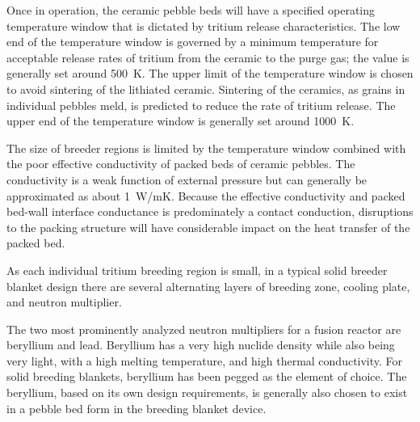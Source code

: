Once in operation, the ceramic pebble beds will have a specified operating temperature window that is dictated by tritium release characteristics. The low end of the temperature window is governed by a minimum temperature for acceptable release rates of tritium from the ceramic to the purge gas; the value is generally set around 500~K. The upper limit of the temperature window is chosen to avoid sintering of the lithiated ceramic. Sintering of the ceramics, as grains in individual pebbles meld, is predicted to reduce the rate of tritium release. The upper end of the temperature window is generally set around 1000~K.

The size of breeder regions is limited by the temperature window combined with the poor effective conductivity of packed beds of ceramic pebbles. The conductivity is a weak function of external pressure but can generally be approximated as about \si{1 W/{mK}}. Because the effective conductivity and packed bed-wall interface conductance is predominately a contact conduction, disruptions to the packing structure will have considerable impact on the heat transfer of the packed bed.

As each individual tritium breeding region is small, in a typical solid breeder blanket design there are several alternating layers of breeding zone, cooling plate, and neutron multiplier. 

The two most prominently analyzed neutron multipliers for a fusion reactor are beryllium and lead. Beryllium has a very high nuclide density while also being very light, with a high melting temperature, and high thermal conductivity. For solid breeding blankets, beryllium has been pegged as the element of choice. The beryllium, based on its own design requirements, is generally also chosen to exist in a pebble bed form in the breeding blanket device.

